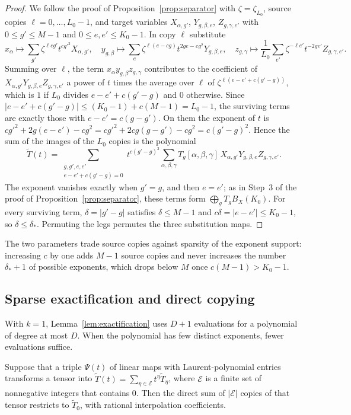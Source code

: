 \begin{proof}
We follow the proof of Proposition~\ref{prop:separator} with
\(\zeta=\zeta_{L_0}\), source copies \(\ell=0,\ldots,L_0-1\), and target
variables \(X_{\alpha,g'}\), \(Y_{g,\beta,e}\), \(Z_{g,\gamma,e'}\) with
\(0\le g'\le M-1\) and \(0\le e,e'\le K_0-1\). In copy \(\ell\) substitute
\[
 x_\alpha\mapsto\sum_{g'}\zeta^{\ell cg'}t^{cg'^2}X_{\alpha,g'},\quad
 y_{g,\beta}\mapsto\sum_{e}\zeta^{\ell(e-cg)}t^{2ge-cg^2}Y_{g,\beta,e},\quad
 z_{g,\gamma}\mapsto\frac1{L_0}\sum_{e'}\zeta^{-\ell e'}t^{-2ge'}
 Z_{g,\gamma,e'}.
\]
Summing over \(\ell\), the term \(x_\alpha y_{g,\beta}z_{g,\gamma}\)
contributes to the coefficient of \(X_{\alpha,g'}Y_{g,\beta,e}Z_{g,\gamma,e'}\)
a power of \(t\) times the average over \(\ell\) of
\(\zeta^{\ell(e-e'+c(g'-g))}\), which is \(1\) if \(L_0\) divides
\(e-e'+c(g'-g)\) and \(0\) otherwise. Since
\(|e-e'+c(g'-g)|\le(K_0-1)+c(M-1)=L_0-1\), the surviving terms are exactly
those with \(e-e'=c(g-g')\). On them the exponent of \(t\) is
\(cg'^2+2g(e-e')-cg^2=cg'^2+2cg(g-g')-cg^2=c(g'-g)^2\). Hence the sum
of the images of the \(L_0\) copies is the polynomial
\[
 \widetilde T(t)=\sum_{\substack{g,g',e,e'\\e-e'+c(g'-g)=0}}t^{c(g'-g)^2}
 \sum_{\alpha,\beta,\gamma}T_g[\alpha,\beta,\gamma]\,
 X_{\alpha,g'}Y_{g,\beta,e}Z_{g,\gamma,e'}.
\]
The exponent vanishes exactly when \(g'=g\), and then \(e=e'\); as in
Step~3 of the proof of Proposition~\ref{prop:separator}, these terms form
\(\bigoplus_gT_gB_X(K_0)\). For every surviving term, \(\delta=|g'-g|\)
satisfies \(\delta\le M-1\) and \(c\delta=|e-e'|\le K_0-1\), so \(\delta\le\delta_*\).
Permuting the legs permutes the three substitution maps.
\end{proof}

The two parameters trade source copies against sparsity of the exponent
support: increasing \(c\) by one adds \(M-1\) source copies and never
increases the number \(\delta_*+1\) of possible exponents, which drops
below \(M\) once \(c(M-1)>K_0-1\).

\subsection{Sparse exactification and direct copying}

With \(k=1\), Lemma~\ref{lem:exactification} uses \(D+1\) evaluations for
a polynomial of degree at most \(D\). When the polynomial has few distinct
exponents, fewer evaluations suffice.

\begin{lemma}\label{lem:sparse-exactification}
Suppose that a triple \(\Psi(t)\) of linear maps with Laurent-polynomial
entries transforms a tensor into
\(\widetilde T(t)=\sum_{\eta\in\mathcal E}t^\eta\widetilde T_\eta\), where
\(\mathcal E\) is a finite set of nonnegative integers that contains \(0\).
Then the direct sum of \(|\mathcal E|\) copies of that tensor restricts to
\(\widetilde T_0\), with rational interpolation coefficients.
\end{lemma}


